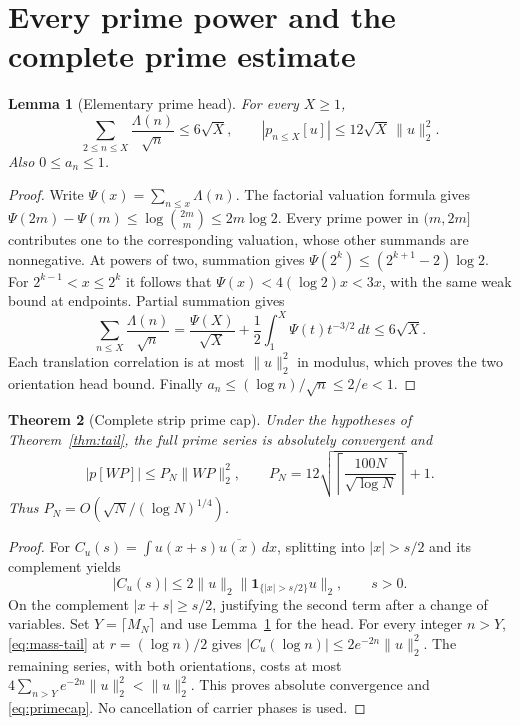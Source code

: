 \documentclass[11pt]{article}
\newtheorem{theorem}{Theorem}[section]
\newtheorem{lemma}[theorem]{Lemma}
\theoremstyle{remark}
\newcommand{\norm}[1]{\lVert #1\rVert}
\newcommand{\one}{\mathbf 1}
\begin{document}
\section{Every prime power and the complete prime estimate}
\begin{lemma}[Elementary prime head]\label{lem:head}
For every $X\ge1$,
\begin{equation}\label{eq:head}
 \sum_{2\le n\le X}\frac{\Lambda(n)}{\sqrt n}\le6\sqrt X,
 \qquad |p_{n\le X}[u]|\le12\sqrt X\,\norm u_2^2.
\end{equation}
Also $0\le a_n\le1$.
\end{lemma}
\begin{proof}
Write $\Psi(x)=\sum_{n\le x}\Lambda(n)$.
The factorial valuation formula gives
$\Psi(2m)-\Psi(m)\le\log\binom{2m}{m}\le2m\log2$.
Every prime power in $(m,2m]$ contributes one to the corresponding
valuation, whose other summands are nonnegative.
At powers of two, summation gives
$\Psi(2^k)\le(2^{k+1}-2)\log2$.
For $2^{k-1}<x\le2^k$ it follows that
$\Psi(x)<4(\log2)x<3x$, with the same weak bound at endpoints.
Partial summation gives
\[
 \sum_{n\le X}\frac{\Lambda(n)}{\sqrt n}
    =\frac{\Psi(X)}{\sqrt X}
       +\frac12\int_1^X\Psi(t)t^{-3/2}\,dt\le6\sqrt X.
\]
Each translation correlation is at most $\norm u_2^2$ in modulus,
which proves the two orientation head bound.
Finally $a_n\le(\log n)/\sqrt n\le2/e<1$.
\end{proof}

\begin{theorem}[Complete strip prime cap]\label{thm:prime}
Under the hypotheses of Theorem~\ref{thm:tail}, the full prime series
is absolutely convergent and
\begin{equation}\label{eq:primecap}
 |p[WP]|\le P_N\norm{WP}_2^2,\qquad
 P_N=12\sqrt{\left\lceil\frac{100N}{\sqrt{\log N}}\right\rceil}+1.
\end{equation}
Thus $P_N=O(\sqrt N/(\log N)^{1/4})$.
\end{theorem}
\begin{proof}
For $C_u(s)=\int u(x+s)\overline{u(x)}\,dx$, splitting into
$|x|>s/2$ and its complement yields
\begin{equation}\label{eq:correlation}
 |C_u(s)|\le2\norm u_2\norm{\one_{\{|x|>s/2\}}u}_2,\qquad s>0.
\end{equation}
On the complement $|x+s|\ge s/2$, justifying the second term after
a change of variables.
Set $Y=\lceil M_N\rceil$ and use Lemma~\ref{lem:head} for the head.
For every integer $n>Y$, \eqref{eq:mass-tail} at $r=(\log n)/2$ gives
$|C_u(\log n)|\le2e^{-2n}\norm u_2^2$.
The remaining series, with both orientations, costs at most
$4\sum_{n>Y}e^{-2n}\norm u_2^2<\norm u_2^2$.
This proves absolute convergence and \eqref{eq:primecap}.
No cancellation of carrier phases is used.
\end{proof}
\end{document}

